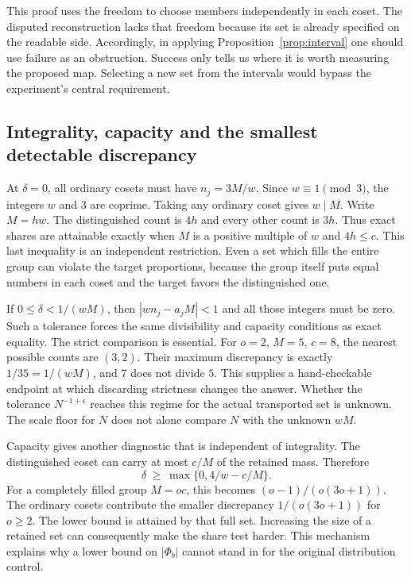 \documentclass[12pt,letterpaper]{article}
\begin{document}
This proof uses the freedom to choose members independently in each coset. The disputed reconstruction lacks that freedom because its set is already specified on the readable side. Accordingly, in applying Proposition~\ref{prop:interval} one should use failure as an obstruction. Success only tells us where it is worth measuring the proposed map. Selecting a new set from the intervals would bypass the experiment's central requirement.

\subsection{Integrality, capacity and the smallest detectable discrepancy}
At $\delta=0$, all ordinary cosets must have $n_j=3M/w$. Since $w\equiv1\pmod3$, the integers $w$ and $3$ are coprime. Taking any ordinary coset gives $w\mid M$. Write $M=hw$. The distinguished count is $4h$ and every other count is $3h$. Thus exact shares are attainable exactly when $M$ is a positive multiple of $w$ and $4h\le c$. This last inequality is an independent restriction. Even a set which fills the entire group can violate the target proportions, because the group itself puts equal numbers in each coset and the target favors the distinguished one.

If $0\le\delta<1/(wM)$, then $|wn_j-a_jM|<1$ and all those integers must be zero. Such a tolerance forces the same divisibility and capacity conditions as exact equality. The strict comparison is essential. For $o=2$, $M=5$, $c=8$, the nearest possible counts are $(3,2)$. Their maximum discrepancy is exactly $1/35=1/(wM)$, and $7$ does not divide $5$. This supplies a hand-checkable endpoint at which discarding strictness changes the answer. Whether the tolerance $N^{-1+\epsilon}$ reaches this regime for the actual transported set is unknown. The scale floor for $N$ does not alone compare $N$ with the unknown $wM$.

Capacity gives another diagnostic that is independent of integrality. The distinguished coset can carry at most $c/M$ of the retained mass. Therefore
\[
                   \delta\ \ge\ \max\{0,4/w-c/M\}.
\]
For a completely filled group $M=oc$, this becomes $(o-1)/(o(3o+1))$. The ordinary cosets contribute the smaller discrepancy $1/(o(3o+1))$ for $o\ge2$. The lower bound is attained by that full set. Increasing the size of a retained set can consequently make the share test harder. This mechanism explains why a lower bound on $|\Phi_b|$ cannot stand in for the original distribution control.
\end{document}
